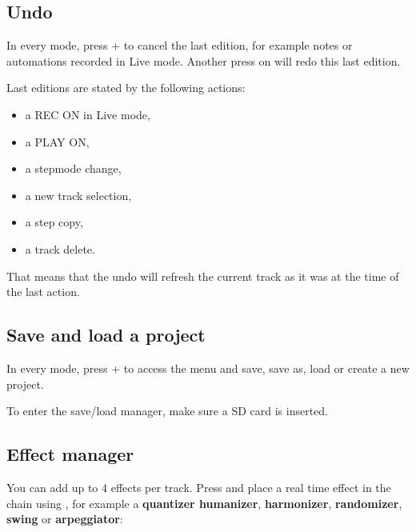 


\subsection{Undo}

In every mode, press  +  to cancel the last edition, for example notes or automations recorded in Live mode. Another press on  will redo this last edition.

Last editions are stated by the following actions:

\begin{itemize}
\item a REC ON in Live mode,
\item a PLAY ON,
\item a stepmode change,
\item a new track selection,
\item a step copy,
\item a track delete.
\end{itemize}

That means that the undo will refresh the current track as it was at the time of the last action.


\subsection{Save and load a project}
In every mode, press  +  to access the menu and save, save as, load or create a new project.


To enter the save/load manager, make sure a SD card is inserted.


\subsection{Effect manager}

You can add up to 4 effects per track. Press  and place a real time effect in the chain using \encodericon{}, for example a \textbf{quantizer humanizer}, \textbf{harmonizer}, \textbf{randomizer}, \textbf{swing} or \textbf{arpeggiator}:

